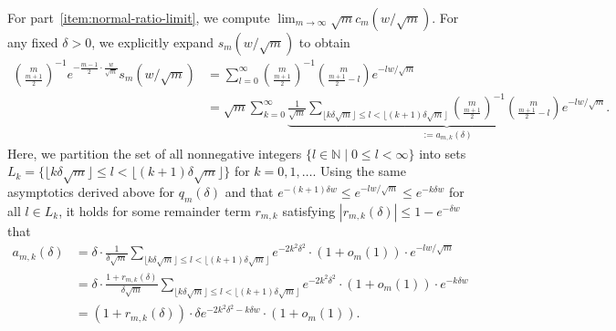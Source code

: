 \documentclass[11pt]{article}
\newcommand{\N}{\mathbb{N}} %
\newcommand{\prn}[1]{\left({#1}\right)} %
\newcommand{\<}{\langle} %
\renewcommand{\>}{\rangle}
\begin{document}
For part~\ref{item:normal-ratio-limit}, we compute $\lim_{m \to \infty}
\sqrt{m} c_m(w/\sqrt{m})$. For any fixed $\delta > 0$, we explicitly expand
$s_m(w/\sqrt{m})$ to obtain
\begin{align*}
	\binom{m}{\frac{m+1}{2}}^{-1} e^{-\frac{m-1}{2} \cdot \frac{w}{\sqrt{m}}} s_m(w/\sqrt{m}) & = \sum_{l=0}^\infty \binom{m}{\frac{m+1}{2}}^{-1} \binom{m}{\frac{m+1}{2} - l} e^{-lw/\sqrt{m}} \nonumber \\
	& = \sqrt{m}  \sum_{k=0}^{\infty} \underbrace{\frac{1}{\sqrt{m} }\sum_{\lfloor k \delta \sqrt{m} \rfloor \leq l < \lfloor (k+1) \delta \sqrt{m}  \rfloor} \binom{m}{\frac{m+1}{2}}^{-1} \binom{m}{\frac{m+1}{2} - l} e^{-lw/\sqrt{m}}}_{:=a_{m,k}(\delta)}.
\end{align*}
Here, we partition the set of all nonnegative integers $\{l \in \N \mid 0
\leq l < \infty\}$ into sets $L_k = \{\lfloor k \delta \sqrt{m} \rfloor
\leq l < \lfloor (k+1) \delta \sqrt{m} \rfloor \}$ for $k = 0, 1, \ldots$.
Using the same asymptotics derived
above for $q_m(\delta)$ and that $e^{-(k+1) \delta w} \leq e^{-lw/\sqrt{m}}
\leq e^{-k \delta w} $ for all $l \in L_k$, it holds for some
remainder term $r_{m,k}$ satisfying
$|r_{m,k}(\delta)| \leq 1 - e^{-\delta w}$ that
\begin{align*}
	a_{m,k}(\delta) & = \delta \cdot \frac{1}{\delta \sqrt{m}} \sum_{\lfloor k \delta \sqrt{m} \rfloor \leq l < \lfloor (k+1) \delta \sqrt{m}  \rfloor} e^{-2k^2 \delta^2}  \cdot (1 + o_m(1)) \cdot  e^{-lw/\sqrt{m}} \nonumber \\
	& = \delta \cdot \frac{1 + r_{m,k}(\delta)}{\delta \sqrt{m}} \sum_{\lfloor k \delta \sqrt{m} \rfloor \leq l < \lfloor (k+1) \delta \sqrt{m}  \rfloor} e^{-2k^2 \delta^2}  \cdot (1 + o_m(1)) \cdot  e^{-k \delta w} \nonumber \\
	& = \prn{1 + r_{m,k}(\delta)} \cdot \delta e^{-2k^2 \delta^2-k\delta w} \cdot (1 + o_m(1)).
\end{align*}
\end{document}
